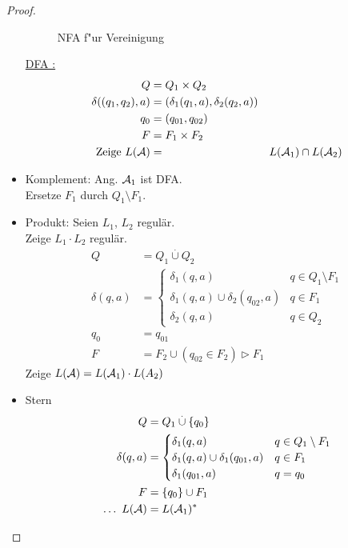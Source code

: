 \begin{proof}
\begin{itemize}
\begin{figure}[tp]
            \caption{\acs{NFA} f"ur Vereinigung}
            \label{fig:reg-closure-union}
        \end{figure}
		\underline{DFA :}
		\begin{align*}
			Q &= Q_1\times Q_2\\
			\delta((q_1,q_2),a) &= (\delta_1(q_1,a),\delta_2(q_2,a))\\
			q_0 &= (q_{01},q_{02})\\
			F &= F_1\times F_2\\
			\text{Zeige }L(\mathcal{A}) &= &L(\mathcal{A}_1)\cap L(\mathcal{A}_2)
		\end{align*}
	\item Komplement: Ang. $\mathcal{A}_1$ ist \ac{DFA}.\\
		Ersetze $F_1$ durch $Q_1\setminus F_1$.
%
%
	\item Produkt: Seien $L_1$, $L_2$ regulär.\\
		Zeige $L_1\cdot L_2$ regulär.
		\begin{align*}
			Q &= Q_1 \overset.\cup Q_2\\
			\delta(q,a) &=
				\begin{cases}
					\delta_1(q,a) & q\in Q_1\setminus F_1\\
					\delta_1(q,a)\cup\delta_2(q_{02},a) & q\in F_1\\
					\delta_2(q,a) & q\in Q_2
				\end{cases}\\
		q_0& = q_{01}\\
		F &= F_2\cup(q_{02}\in F_2) \rhd F_1
		\end{align*}
		Zeige $L(\mathcal{A}) = L(\mathcal{A}_1)\cdot L(A_2)$
	\item Stern
	\begin{align*}
		Q &= Q_1\overset.\cup \{q_0\}\\
		\delta(q,a) &=
			\begin{cases}
				\delta_1(q,a) & q\in Q_1\setminus F_1\\
				\delta_1(q,a)\cup\delta_1(q_{01},a) & q\in F_1\\
				\delta_1(q_{01},a) & q=q_0
			\end{cases}\\
		F &= \{q_0\}\cup F_1\\
		\dots\ L(\mathcal{A}) &= L(\mathcal{A}_1)^*
	\end{align*}
	\end{itemize}
\end{proof}
%
